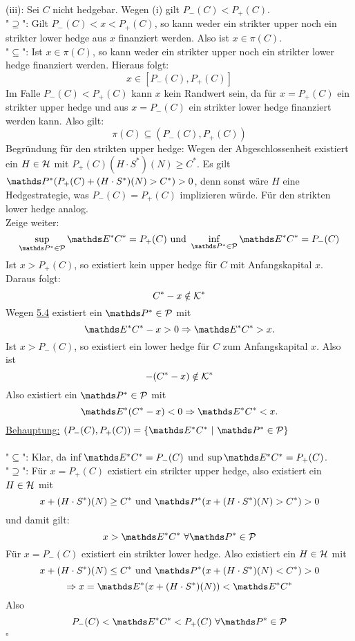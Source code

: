 (iii):
Sei $C$ nicht hedgebar.
Wegen (i) gilt $P_-(C)<P_+(C)$.\\
"$\supseteq$":
Gilt $P_-(C)<x<P_+(C)$, so kann weder ein strikter upper noch ein strikter lower hedge aus $x$ finanziert werden.
Also ist $x\in \pi(C)$.\\
"$\subseteq$":
Ist $x\in\pi(C)$, so kann weder ein strikter upper noch ein strikter lower hedge finanziert werden.
Hieraus folgt:
\[
x\in [P_-(C),P_+(C)]
\]
Im Falle $P_-(C)<P_+(C)$ kann $x$ kein Randwert sein, da für $x=P_+(C)$ ein strikter upper hedge und aus $x=P_-(C)$ ein strikter lower hedge finanziert werden kann.
Also gilt:
\[
\pi(C)\subseteq (P_-(C),P_+(C))
\]
Begründung für den strikten upper hedge:
Wegen der Abgeschlossenheit existiert ein $H\in\mathcal{H}$ mit $P_+(C)(H\cdot S^*)(N)\ge C^*$.
Es gilt $\Pw^*(P_+(C)+(H\cdot S^*)(N)>C^*)>0$, denn sonst wäre $H$ eine Hedgestrategie, was $P_-(C)=P_+(C)$ implizieren würde.
Für den strikten lower hedge analog.\\

Zeige weiter:
\[
\sup\limits_{\Pw^*\in\mc{P}}\E^*C^*=P_+(C) \text{ und } \inf\limits_{\Pw^*\in\mc{P}}\E^*C^*=P_-(C)
\]
Ist $x>P_+(C)$, so existiert kein upper hedge für $C$ mit Anfangskapital $x$.
Daraus folgt:
\[
C^*-x\notin \mathcal{K}^*
\]
Wegen \hyperref[sub:satz_4fima]{5.4} existiert ein $\Pw^*\in\mc{P}$ mit
\[
\E^*C^*-x>0\Rightarrow \E^*C^*>x.
\]
Ist $x>P_-(C)$, so existiert ein lower hedge für $C$ zum Anfangskapital $x$.
Also ist
\[
-(C^*-x)\notin \mathcal{K}^*
\]
Also existiert ein $\Pw^*\in\mc{P}$ mit 
\[
\E^*(C^*-x)<0 \Rightarrow \E^*C^*<x.
\]
\uline{Behauptung:}
$(P_-(C),P_+(C))=\penbrace{\E^*C^*~|~\Pw^*\in\mc{P}}$\\

\\
"$\subseteq$":
Klar, da $\inf \E^*C^*=P_-(C)$ und $\sup\E^*C^*=P_+(C)$.\\
"$\supseteq$":
Für $x=P_+(C)$ existiert ein strikter upper hedge, also existiert ein $H\in\mathcal{H}$ mit 
\[
x+(H\cdot S^*)(N)\ge C^* \text{ und }\Pw^*(x+(H\cdot S^*)(N)>C^*)>0
\]
und damit gilt:
\[
x>\E^*C^*~\forall \Pw^*\in\mc{P}
\]
Für $x=P_-(C)$ existiert ein strikter lower hedge.
Also existiert ein $H\in\mathcal{H}$ mit
\[
x+(H\cdot S^*)(N)\le C^* \text{ und } \Pw^*(x+(H\cdot S^*)(N)<C^*)>0
\]
\[
\Rightarrow x=\E^*(x+(H\cdot S^*)(N))<\E^*C^*
\]
Also
\[
P_-(C)<\E^*C^*<P_+(C)~\forall \Pw^*\in\mc{P}
\]
\hfill $\square$

